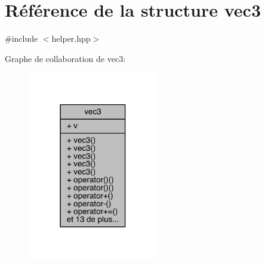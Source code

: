 \hypertarget{structvec3}{\section{Référence de la structure vec3}
\label{structvec3}
}


{\ttfamily \#include $<$helper.\+hpp$>$}



Graphe de collaboration de vec3\+:
\nopagebreak
\begin{figure}[H]
\begin{center}
\leavevmode
\includegraphics[width=162pt]{structvec3__coll__graph}
\end{center}
\end{figure}
